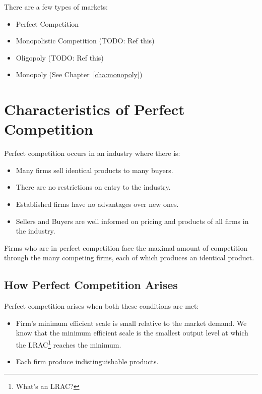             There are a few types of markets:
            \begin{itemize}
                \item Perfect Competition
                \item Monopolistic Competition (TODO: Ref this)
                \item Oligopoly (TODO: Ref this)
                \item Monopoly (See Chapter~\ref{cha:monopoly})
            \end{itemize}
            \section{Characteristics of Perfect Competition} %
            \label{sec:characteristics_of_perfect_competition}
                Perfect competition occurs in an industry where there is:
                \begin{itemize}
                    \item Many firms sell identical products to many buyers.
                    \item There are no restrictions on entry to the industry.
                    \item Established firms have no advantages over new ones.
                    \item Sellers and Buyers are well informed on pricing and products of all firms in the industry.
                \end{itemize}
                Firms who are in perfect competition face the maximal amount of competition through the many competing firms, each of which produces an identical product.
                \subsection{How Perfect Competition Arises} %
                \label{sub:how_perfect_competition_arises}
                    Perfect competition arises when both these conditions are met:
                    \begin{itemize}
                        \item Firm's minimum efficient scale is small relative to the market demand.
                        We know that the minimum efficient scale is the smallest output level at which the LRAC\footnote{What's an LRAC?} reaches the minimum.
                        \item Each firm produce indistinguishable products.
                    \end{itemize}
